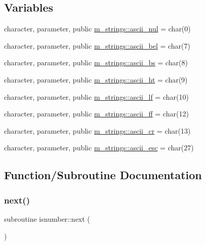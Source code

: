 \subsection*{Variables}
\begin{DoxyCompactItemize}
\item 
character, parameter, public \mbox{\hyperlink{namespacem__strings_a9de5098e31c6411a43323b1d7f19a886}{m\+\_\+strings\+::ascii\+\_\+nul}} = char(0)
\item 
character, parameter, public \mbox{\hyperlink{namespacem__strings_ae939ea755cfa377c5ed5f09ba8b0e923}{m\+\_\+strings\+::ascii\+\_\+bel}} = char(7)
\item 
character, parameter, public \mbox{\hyperlink{namespacem__strings_a6d4b461b6fba6d81e0cee7b6e579c77b}{m\+\_\+strings\+::ascii\+\_\+bs}} = char(8)
\item 
character, parameter, public \mbox{\hyperlink{namespacem__strings_a3fef6116790e59c99f48ea31a7b00133}{m\+\_\+strings\+::ascii\+\_\+ht}} = char(9)
\item 
character, parameter, public \mbox{\hyperlink{namespacem__strings_a4d65d248433f7c6ea3188c558f795c23}{m\+\_\+strings\+::ascii\+\_\+lf}} = char(10)
\item 
character, parameter, public \mbox{\hyperlink{namespacem__strings_a52761941cc3dba4a2ed922d1b7841c90}{m\+\_\+strings\+::ascii\+\_\+ff}} = char(12)
\item 
character, parameter, public \mbox{\hyperlink{namespacem__strings_a1f58b48efb41665079ced6de505a3b65}{m\+\_\+strings\+::ascii\+\_\+cr}} = char(13)
\item 
character, parameter, public \mbox{\hyperlink{namespacem__strings_a6e9a1f921d2bb4a14a9b50a3b8f96288}{m\+\_\+strings\+::ascii\+\_\+esc}} = char(27)
\end{DoxyCompactItemize}


\subsection{Function/\+Subroutine Documentation}
\mbox{\label{M__strings_8f90_a4ca03eba3c35c5b7fbc751d60bc4d1e9}} 
\subsubsection{\texorpdfstring{next()}{next()}}
{\footnotesize\ttfamily subroutine isnumber\+::next (\begin{DoxyParamCaption}{ }\end{DoxyParamCaption})\hspace{0.3cm}{\ttfamily [private]}}



